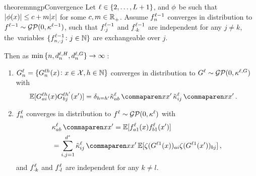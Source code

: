 \documentclass{article}
\begin{document}
\begin{restatable}{theorem}{nngpConvergence}
\label{thm:gp_convergence_sqrt}
    Let 
    $\ell \in \{ 2, \ldots , L + 1 \}$, and 
    $\phi$ be such that $|\phi(x)| \leq c + m |x|$ for some $c, m \in \mathbb{R}^{}_+$.
    Assume $f_{n}^{\ell - 1}$
    converges in distribution to $f^{\ell - 1} \sim \mathcal{GP}(0, \kappa^{\ell-1})$, such that $f_{\cdot j}^{\ell - 1}$ and $f_{\cdot k}^{\ell - 1}$ are independent for any $j \neq k$,
    the~variables $\{ f_{n, \cdot j}^{\ell - 1} \colon j \in \mathbb{N} \}$ are exchangeable over $j$.
    
    Then as $ \min \, \{ n, d_{n}^{\ell, H} , d_{n}^{\ell, G} \} \to \infty \, $:
    \vspace{-0.5\baselineskip}
    \begin{enumerate}[\hspace{-0.5em}(I)]
        \renewcommand\labelenumi{\emph{\bfseries(\theenumi)}}
        \item 
        $G_{n}^{\ell} = \{ G_{n}^{\ell h}(x) \colon x \in \mathcal{X} , h \in \mathbb{N}  \}$ converges in distribution to $G^{\ell} \sim \mathcal{GP} (0, \kappa^{\ell, G})$ with
        \begin{align}\label{eq:logit_cov}
            \E [\logitSymbol_{a i}^{\depthSymbol \headIndex}(\inputSymbol) \logitSymbol_{b j}^{\depthSymbol \headIndex'}(\inputSymbol')]
            &=
            \delta_{\headIndex = \headIndex'}
            \kerntildef{a b}{\depthSymbol}{\inputSymbol}{\inputSymbol'} \,
            \kerntildef{i j}{\depthSymbol}{\inputSymbol}{\inputSymbol'}
            \, .
        \end{align}
        
        \item 
        $f_{n}^{\ell}$ converges in distribution to $f^{\ell} \sim \mathcal{GP}(0, \kappa^{\ell})$ with
        \begin{align}\label{eq:sqrt_scaling_kernel}
            &\kernelf{a b}{\depthSymbol}{\inputSymbol}{\inputSymbol'}
            =
            \E [
                \activationSymbol_{a1}^{\depthSymbol}(\inputSymbol)
                \activationSymbol_{b1}^{\depthSymbol}(\inputSymbol')
            ]
            \\
            &=
            \sum_{i , j = 1}^{\spatialDimension} 
                \kerntildef{i j}{\depthSymbol}{\inputSymbol}{\inputSymbol'}
                \E [\softmax(\logitSymbol^{\depthSymbol 1}(\inputSymbol))_{a i} \softmax(\logitSymbol^{\depthSymbol 1}(\inputSymbol'))_{b j}]
            \nonumber
            \, ,
        \end{align}
        and $f_{\cdot k}^{\ell}$ and $f_{\cdot l}^{\ell}$ are independent for any $k \neq l$.
    \end{enumerate}
\end{restatable}
\end{document}
